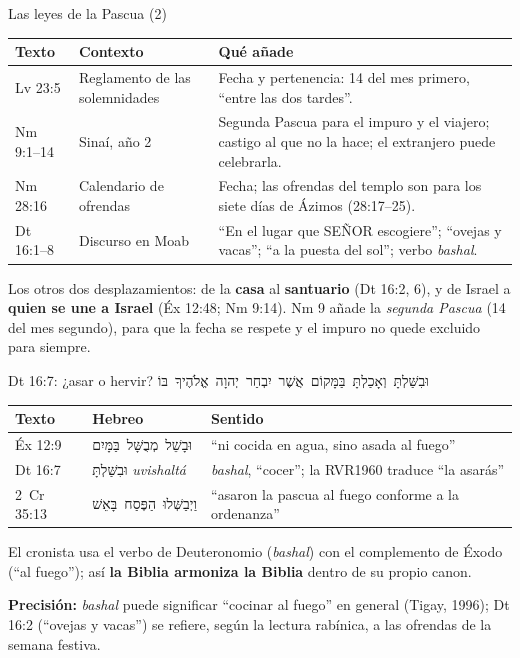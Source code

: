 \documentclass[hyperref={bookmarks=false},aspectratio=169]{beamer}
\newcommand{\heb}[1]{\mbox{\foreignlanguage{hebrew}{#1}}}
\newcommand{\SENOR}{S{\fontsize{0.78em}{1em}\selectfont EÑOR}}
\newcommand{\destacar}[1]{\textbf{\textcolor{tierraroja}{#1}}}
\newcommand{\precision}[1]{{\footnotesize\color{sepia}\textbf{Precisión:} #1}}
\begin{document}
\begin{frame}{Las leyes de la Pascua (2)}
\scriptsize\renewcommand{\arraystretch}{1.15}
\begin{tabular}{@{}L{1.9cm}L{2.6cm}L{7.6cm}@{}}
\toprule
\textbf{Texto} & \textbf{Contexto} & \textbf{Qué añade} \\ \midrule
Lv 23:5 & Reglamento de las solemnidades & Fecha y pertenencia: 14 del mes primero, ``entre las dos tardes''. \\
Nm 9:1--14 & Sinaí, año 2 & Segunda Pascua para el impuro y el viajero; castigo al que no la hace; el extranjero puede celebrarla. \\
Nm 28:16 & Calendario de ofrendas & Fecha; las ofrendas del templo son para los siete días de Ázimos (28:17--25). \\
Dt 16:1--8 & Discurso en Moab & ``En el lugar que \SENOR{} escogiere''; ``ovejas y vacas''; ``a la puesta del sol''; verbo \emph{bashal}. \\
\bottomrule
\end{tabular}\par\medskip
\small\RaggedRight Los otros dos desplazamientos: de la \destacar{casa} al \destacar{santuario} (Dt 16:2, 6), y de Israel a \destacar{quien se une a Israel} (Éx 12:48; Nm 9:14). Nm 9 añade la \emph{segunda Pascua} (14 del mes segundo), para que la fecha se respete y el impuro no quede excluido para siempre.
\end{frame}


\begin{frame}{Dt 16:7: ¿asar o hervir?}
\centering\heb{וּבִשַּׁלְתָּ וְאָכַלְתָּ בַּמָּקוֹם אֲשֶׁר יִבְחַר יְהוָה אֱלֹהֶיךָ בּוֹ}\par\smallskip
\scriptsize\renewcommand{\arraystretch}{1.18}
\begin{tabular}{@{}L{2.0cm}L{4.6cm}L{5.5cm}@{}}
\toprule
\textbf{Texto} & \textbf{Hebreo} & \textbf{Sentido} \\ \midrule
Éx 12:9 & \heb{וּבָשֵׁל מְבֻשָּׁל בַּמָּיִם} & ``ni cocida en agua, sino asada al fuego'' \\
Dt 16:7 & \heb{וּבִשַּׁלְתָּ} \emph{uvishaltá} & \emph{bashal}, ``cocer''; la RVR1960 traduce ``la asarás'' \\
2~Cr 35:13 & \heb{וַיְבַשְּׁלוּ הַפֶּסַח בָּאֵשׁ} & ``asaron la pascua al fuego conforme a la ordenanza'' \\
\bottomrule
\end{tabular}\par\medskip
\small\RaggedRight El cronista usa el verbo de Deuteronomio (\emph{bashal}) con el complemento de Éxodo (``al fuego''); así \destacar{la Biblia armoniza la Biblia} dentro de su propio canon.\par\smallskip
\precision{\emph{bashal} puede significar ``cocinar al fuego'' en general (Tigay, 1996); Dt 16:2 (``ovejas y vacas'') se refiere, según la lectura rabínica, a las ofrendas de la semana festiva.}
\end{frame}
\end{document}
